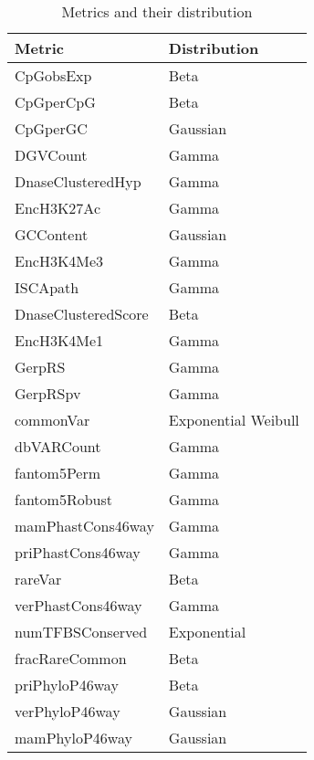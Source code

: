 \begin{table}
	\begin{tabular}{|l|l|}
		\hline
		\textbf{Metric}     & \textbf{Distribution} \\
		\hline
		CpGobsExp           & Beta                  \\
		\hline
		CpGperCpG           & Beta                  \\
		\hline
		CpGperGC            & Gaussian              \\
		\hline
		DGVCount            & Gamma                 \\
		\hline
		DnaseClusteredHyp   & Gamma                 \\
		\hline
		EncH3K27Ac          & Gamma                 \\
		\hline
		GCContent           & Gaussian              \\
		\hline
		EncH3K4Me3          & Gamma                 \\
		\hline
		ISCApath            & Gamma                 \\
		\hline
		DnaseClusteredScore & Beta                  \\
		\hline
		EncH3K4Me1          & Gamma                 \\
		\hline
		GerpRS              & Gamma                 \\
		\hline
		GerpRSpv            & Gamma                 \\
		\hline
		commonVar           & Exponential Weibull   \\
		\hline
		dbVARCount          & Gamma                 \\
		\hline
		fantom5Perm         & Gamma                 \\
		\hline
		fantom5Robust       & Gamma                 \\
		\hline
		mamPhastCons46way   & Gamma                 \\
		\hline
		priPhastCons46way   & Gamma                 \\
		\hline
		rareVar             & Beta                  \\
		\hline
		verPhastCons46way   & Gamma                 \\
		\hline
		numTFBSConserved    & Exponential           \\
		\hline
		fracRareCommon      & Beta                  \\
		\hline
		priPhyloP46way      & Beta                  \\
		\hline
		verPhyloP46way      & Gaussian              \\
		\hline
		mamPhyloP46way      & Gaussian              \\
		\hline
	\end{tabular}
	\caption{Metrics and their distribution}
\end{table}

